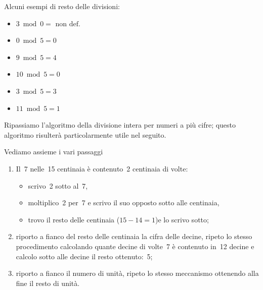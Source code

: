  \begin{esempio}
 Alcuni esempi di resto delle divisioni:
 \vspace{-1em}
\begin{multicols}{3}
\begin{itemize} [nosep]
\item \(3 \bmod 0 = \text{ non def.}\)
\item \(0 \bmod 5 = 0\)
\item \(9 \bmod 5 = 4\)
\item \(10 \bmod 5 = 0\)
\item \(3 \bmod 5 = 3\)
\item \(11 \bmod 5 = 1\)
\end{itemize}
\end{multicols}
\end{esempio}


Ripassiamo l'algoritmo della divisione intera per numeri a più cifre; 
questo algoritmo risulterà particolarmente utile nel seguito.

\vspace{-6pt}
\begin{center}
\begin{inaccessibleblock}
 
\end{inaccessibleblock}
\end{center}
\vspace{-12pt}

Vediamo assieme i vari passaggi
\begin{enumerate} [noitemsep]
 \item Il~7 nelle~15 centinaia è contenuto~2 centinaia di volte:
   \begin{itemize} [nosep]
    \item scrivo~2 sotto al~7,
    \item moltiplico~2 per~7 e scrivo il suo opposto sotto alle centinaia,
    \item trovo il resto delle centinaia (\(15-14=1\))e lo scrivo sotto;
   \end{itemize}
 \item riporto a fianco del resto delle centinaia la cifra delle decine, 
ripeto lo stesso procedimento calcolando quante decine di volte~7 è 
contenuto in~12 decine e calcolo sotto alle decine il resto ottenuto:~5;
 \item riporto a fianco il numero di unità, ripeto lo stesso meccanismo 
ottenendo alla fine il resto di unità.
\end{enumerate}

